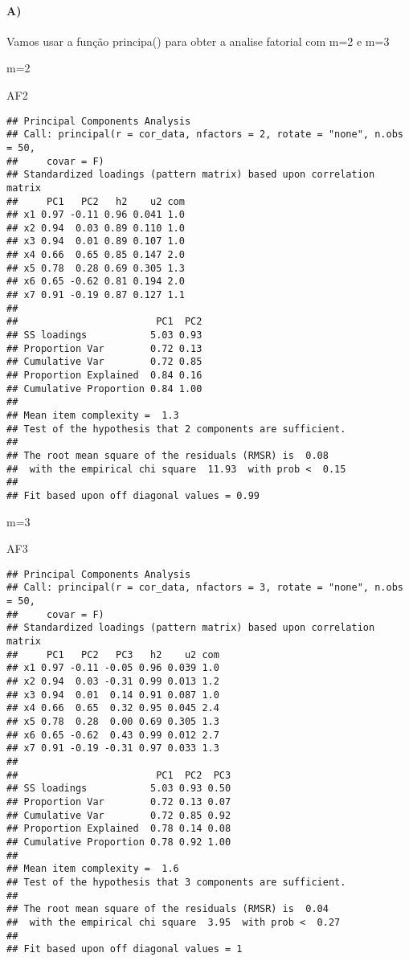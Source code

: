 \documentclass[
]{article}
\newenvironment{Shaded}{\begin{snugshade}}{\end{snugshade}}
\newcommand{\NormalTok}[1]{#1}
\begin{document}
\newpage

\hypertarget{a-2}{%
\paragraph{A)}\label{a-2}}

Vamos usar a função principa() para obter a analise fatorial com m=2 e
m=3

m=2

\begin{Shaded}
\begin{Highlighting}[]
\NormalTok{AF2}
\end{Highlighting}
\end{Shaded}

\begin{verbatim}
## Principal Components Analysis
## Call: principal(r = cor_data, nfactors = 2, rotate = "none", n.obs = 50, 
##     covar = F)
## Standardized loadings (pattern matrix) based upon correlation matrix
##     PC1   PC2   h2    u2 com
## x1 0.97 -0.11 0.96 0.041 1.0
## x2 0.94  0.03 0.89 0.110 1.0
## x3 0.94  0.01 0.89 0.107 1.0
## x4 0.66  0.65 0.85 0.147 2.0
## x5 0.78  0.28 0.69 0.305 1.3
## x6 0.65 -0.62 0.81 0.194 2.0
## x7 0.91 -0.19 0.87 0.127 1.1
## 
##                        PC1  PC2
## SS loadings           5.03 0.93
## Proportion Var        0.72 0.13
## Cumulative Var        0.72 0.85
## Proportion Explained  0.84 0.16
## Cumulative Proportion 0.84 1.00
## 
## Mean item complexity =  1.3
## Test of the hypothesis that 2 components are sufficient.
## 
## The root mean square of the residuals (RMSR) is  0.08 
##  with the empirical chi square  11.93  with prob <  0.15 
## 
## Fit based upon off diagonal values = 0.99
\end{verbatim}

\newpage

m=3

\begin{Shaded}
\begin{Highlighting}[]
\NormalTok{AF3}
\end{Highlighting}
\end{Shaded}

\begin{verbatim}
## Principal Components Analysis
## Call: principal(r = cor_data, nfactors = 3, rotate = "none", n.obs = 50, 
##     covar = F)
## Standardized loadings (pattern matrix) based upon correlation matrix
##     PC1   PC2   PC3   h2    u2 com
## x1 0.97 -0.11 -0.05 0.96 0.039 1.0
## x2 0.94  0.03 -0.31 0.99 0.013 1.2
## x3 0.94  0.01  0.14 0.91 0.087 1.0
## x4 0.66  0.65  0.32 0.95 0.045 2.4
## x5 0.78  0.28  0.00 0.69 0.305 1.3
## x6 0.65 -0.62  0.43 0.99 0.012 2.7
## x7 0.91 -0.19 -0.31 0.97 0.033 1.3
## 
##                        PC1  PC2  PC3
## SS loadings           5.03 0.93 0.50
## Proportion Var        0.72 0.13 0.07
## Cumulative Var        0.72 0.85 0.92
## Proportion Explained  0.78 0.14 0.08
## Cumulative Proportion 0.78 0.92 1.00
## 
## Mean item complexity =  1.6
## Test of the hypothesis that 3 components are sufficient.
## 
## The root mean square of the residuals (RMSR) is  0.04 
##  with the empirical chi square  3.95  with prob <  0.27 
## 
## Fit based upon off diagonal values = 1
\end{verbatim}
\end{document}
